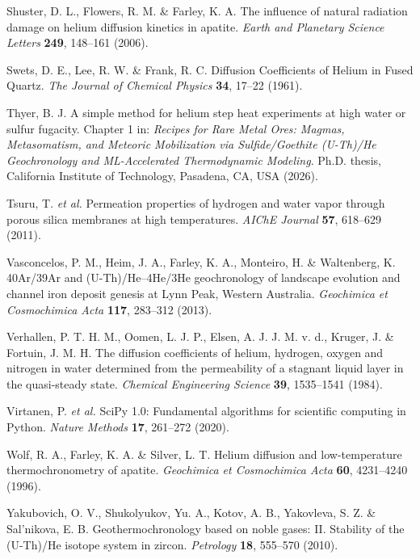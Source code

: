 \documentclass[gchron, manuscript]{copernicus}
\begin{document}
\begin{thebibliography}{}
Shuster, D. L., Flowers, R. M. \& Farley, K. A. The influence of natural radiation damage on helium diffusion kinetics in apatite. \emph{Earth and Planetary Science Letters} \textbf{249}, 148--161 (2006).

Swets, D. E., Lee, R. W. \& Frank, R. C. Diffusion Coefficients of Helium in Fused Quartz. \emph{The Journal of Chemical Physics} \textbf{34}, 17--22 (1961).

Thyer, B. J. A simple method for helium step heat experiments at high water or sulfur fugacity. Chapter 1 in: \emph{Recipes for Rare Metal Ores: Magmas, Metasomatism, and Meteoric Mobilization via Sulfide/Goethite (U-Th)/He Geochronology and ML-Accelerated Thermodynamic Modeling}. Ph.D. thesis, California Institute of Technology, Pasadena, CA, USA (2026).

Tsuru, T. \emph{et al.} Permeation properties of hydrogen and water vapor through porous silica membranes at high temperatures. \emph{AIChE Journal} \textbf{57}, 618--629 (2011).

Vasconcelos, P. M., Heim, J. A., Farley, K. A., Monteiro, H. \& Waltenberg, K. 40Ar/39Ar and (U-Th)/He--4He/3He geochronology of landscape evolution and channel iron deposit genesis at Lynn Peak, Western Australia. \emph{Geochimica et Cosmochimica Acta} \textbf{117}, 283--312 (2013).

Verhallen, P. T. H. M., Oomen, L. J. P., Elsen, A. J. J. M. v. d., Kruger, J. \& Fortuin, J. M. H. The diffusion coefficients of helium, hydrogen, oxygen and nitrogen in water determined from the permeability of a stagnant liquid layer in the quasi-steady state. \emph{Chemical Engineering Science} \textbf{39}, 1535--1541 (1984).

Virtanen, P. \emph{et al.} SciPy 1.0: Fundamental algorithms for scientific computing in Python. \emph{Nature Methods} \textbf{17}, 261--272 (2020).

Wolf, R. A., Farley, K. A. \& Silver, L. T. Helium diffusion and low-temperature thermochronometry of apatite. \emph{Geochimica et Cosmochimica Acta} \textbf{60}, 4231--4240 (1996).

Yakubovich, O. V., Shukolyukov, Yu. A., Kotov, A. B., Yakovleva, S. Z. \& Sal'nikova, E. B. Geothermochronology based on noble gases: II. Stability of the (U-Th)/He isotope system in zircon. \emph{Petrology} \textbf{18}, 555--570 (2010).


\end{thebibliography}
\end{document}
